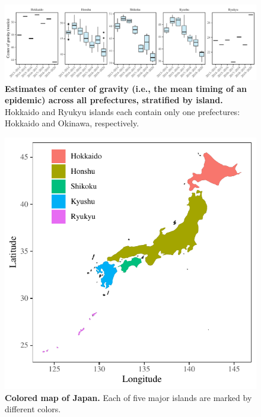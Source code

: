 \documentclass[12pt]{article}
\begin{document}
\begin{figure}[!th]
\includegraphics[width=\textwidth]{../figure/figure1_cog.pdf}
\caption{
\textbf{Estimates of center of gravity (i.e., the mean timing of an epidemic) across all prefectures, stratified by island.}
Hokkaido and Ryukyu islands each contain only one prefectures: Hokkaido and Okinawa, respectively.
}
\end{figure}



\begin{figure}[!th]
\includegraphics[width=\textwidth]{../figure/figure_map.pdf}
\caption{
\textbf{Colored map of Japan.}
Each of five major islands are marked by different colors.
}
\end{figure}

\pagebreak
\end{document}

